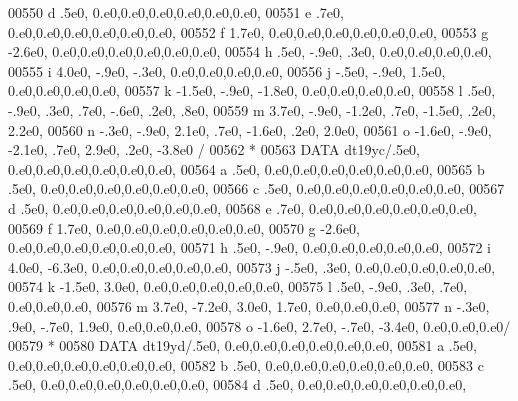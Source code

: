 \begin{DoxyCode}
00550      d            .5e0,                  0.e0,0.e0,0.e0,0.e0,0.e0,0.e0,
00551      e            .7e0,                  0.e0,0.e0,0.e0,0.e0,0.e0,0.e0,
00552      f           1.7e0,                  0.e0,0.e0,0.e0,0.e0,0.e0,0.e0,
00553      g          -2.6e0,                  0.e0,0.e0,0.e0,0.e0,0.e0,0.e0,
00554      h            .5e0,  -.9e0,   .3e0,             0.e0,0.e0,0.e0,0.e0,
00555      i           4.0e0,  -.9e0,  -.3e0,             0.e0,0.e0,0.e0,0.e0,
00556      j           -.5e0,  -.9e0,  1.5e0,             0.e0,0.e0,0.e0,0.e0,
00557      k          -1.5e0,  -.9e0, -1.8e0,             0.e0,0.e0,0.e0,0.e0,
00558      l            .5e0,  -.9e0,   .3e0,   .7e0,  -.6e0,   .2e0,   .8e0,
00559      m           3.7e0,  -.9e0, -1.2e0,   .7e0, -1.5e0,   .2e0,  2.2e0,
00560      n           -.3e0,  -.9e0,  2.1e0,   .7e0, -1.6e0,   .2e0,  2.0e0,
00561      o          -1.6e0,  -.9e0, -2.1e0,   .7e0,  2.9e0,   .2e0, -3.8e0 /
00562 \textcolor{comment}{*}
00563       \textcolor{keyword}{DATA} dt19yc/.5e0,                  0.e0,0.e0,0.e0,0.e0,0.e0,0.e0,
00564      a            .5e0,                  0.e0,0.e0,0.e0,0.e0,0.e0,0.e0,
00565      b            .5e0,                  0.e0,0.e0,0.e0,0.e0,0.e0,0.e0,
00566      c            .5e0,                  0.e0,0.e0,0.e0,0.e0,0.e0,0.e0,
00567      d            .5e0,                  0.e0,0.e0,0.e0,0.e0,0.e0,0.e0,
00568      e            .7e0,                  0.e0,0.e0,0.e0,0.e0,0.e0,0.e0,
00569      f           1.7e0,                  0.e0,0.e0,0.e0,0.e0,0.e0,0.e0,
00570      g          -2.6e0,                  0.e0,0.e0,0.e0,0.e0,0.e0,0.e0,
00571      h            .5e0,  -.9e0,             0.e0,0.e0,0.e0,0.e0,0.e0,
00572      i           4.0e0, -6.3e0,             0.e0,0.e0,0.e0,0.e0,0.e0,
00573      j           -.5e0,   .3e0,             0.e0,0.e0,0.e0,0.e0,0.e0,
00574      k          -1.5e0,  3.0e0,             0.e0,0.e0,0.e0,0.e0,0.e0,
00575      l            .5e0,  -.9e0,   .3e0,   .7e0,          0.e0,0.e0,0.e0,
00576      m           3.7e0, -7.2e0,  3.0e0,  1.7e0,          0.e0,0.e0,0.e0,
00577      n           -.3e0,   .9e0,  -.7e0,  1.9e0,          0.e0,0.e0,0.e0,
00578      o          -1.6e0,  2.7e0,  -.7e0, -3.4e0,          0.e0,0.e0,0.e0/
00579 \textcolor{comment}{*}
00580       \textcolor{keyword}{DATA} dt19yd/.5e0,                  0.e0,0.e0,0.e0,0.e0,0.e0,0.e0,
00581      a            .5e0,                  0.e0,0.e0,0.e0,0.e0,0.e0,0.e0,
00582      b            .5e0,                  0.e0,0.e0,0.e0,0.e0,0.e0,0.e0,
00583      c            .5e0,                  0.e0,0.e0,0.e0,0.e0,0.e0,0.e0,
00584      d            .5e0,                  0.e0,0.e0,0.e0,0.e0,0.e0,0.e0,

\end{DoxyCode}
